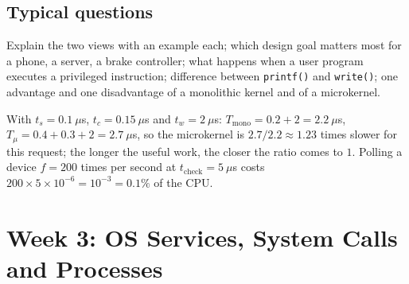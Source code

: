 \documentclass[11pt,a4paper]{article}
\newcommand{\cmd}[1]{\texttt{#1}}
\begin{document}
\subsection*{Typical questions}
Explain the two views with an example each; which design goal matters most for a phone, a server, a brake controller; what happens when a user program executes a privileged instruction; difference between \cmd{printf()} and \cmd{write()}; one advantage and one disadvantage of a monolithic kernel and of a microkernel.

\begin{example}
With $t_s = 0.1\ \mu$s, $t_c = 0.15\ \mu$s and $t_w = 2\ \mu$s: $T_{\text{mono}} = 0.2 + 2 = 2.2\ \mu$s, $T_{\mu} = 0.4 + 0.3 + 2 = 2.7\ \mu$s, so the microkernel is $2.7/2.2 \approx 1.23$ times slower for this request; the longer the useful work, the closer the ratio comes to $1$. Polling a device $f = 200$ times per second at $t_{\text{check}} = 5\ \mu$s costs $200 \times 5\times10^{-6} = 10^{-3} = 0.1\%$ of the CPU.
\end{example}

\section{Week 3: OS Services, System Calls and Processes}
\label{sec:w3}
\end{document}
